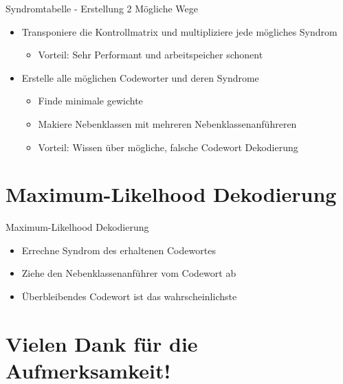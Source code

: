 \documentclass{beamer}
\begin{document}
  \begin{frame}{Syndromtabelle - Erstellung}
	  2 Mögliche Wege
  	  \begin{itemize}
	  \item Transponiere die Kontrollmatrix und multipliziere jede mögliches Syndrom
	  \begin{itemize}
	  \item Vorteil: Sehr Performant und arbeitspeicher schonent
	  \end{itemize}
	  \item Erstelle alle möglichen Codeworter und deren Syndrome
	  \begin{itemize}
	  \item Finde minimale gewichte
	  \item Makiere Nebenklassen mit mehreren Nebenklassenanführeren
	  \item Vorteil: Wissen über mögliche, falsche Codewort Dekodierung
	  \end{itemize}
  	  \end{itemize}
  \end{frame}
    
   
   \section{Maximum-Likelhood Dekodierung}
   \begin{frame}{Maximum-Likelhood Dekodierung}
   \begin{itemize}
	\item Errechne Syndrom des erhaltenen Codewortes
	\item Ziehe den Nebenklassenanführer vom Codewort ab
	\item Überbleibendes Codewort ist das wahrscheinlichste
   \end{itemize}
   \end{frame}
  

\section*{Vielen Dank für die Aufmerksamkeit!}
  
\end{document}
